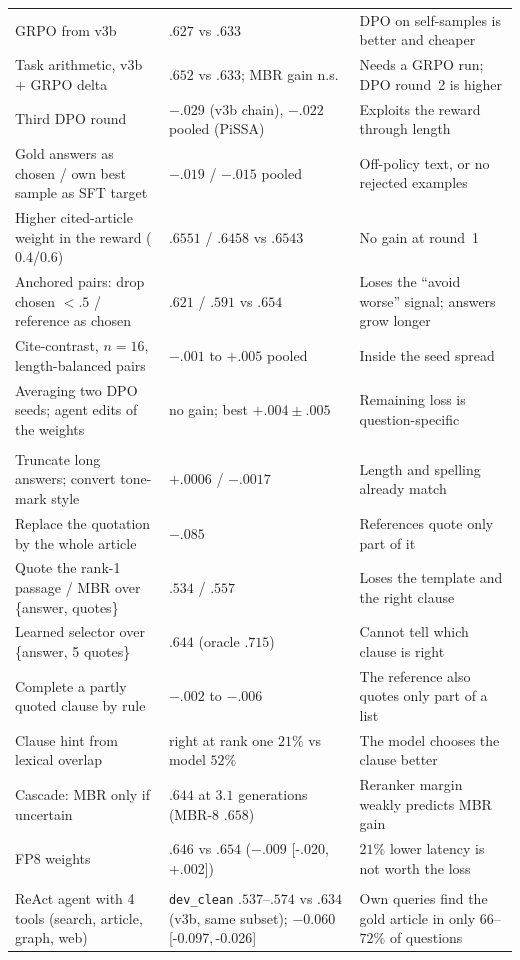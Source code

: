\documentclass[11pt,a4paper]{article}
\newcommand{\ci}[2]{{\scriptsize[#1,\,#2]}}
\begin{document}
\begin{table}[H]
\begin{tabular}{@{}>{\raggedright\arraybackslash}p{5.2cm}>{\raggedright\arraybackslash}p{4.4cm}>{\raggedright\arraybackslash}p{5.6cm}@{}}
GRPO from v3b & $.627$ vs $.633$ & DPO on self-samples is better and cheaper\\
Task arithmetic, v3b + GRPO delta & $.652$ vs $.633$; MBR gain n.s. & Needs a GRPO run; DPO round~2 is higher\\
Third DPO round & $-.029$ (v3b chain), $-.022$ pooled (PiSSA) & Exploits the reward through length\\
Gold answers as chosen / own best sample as SFT target & $-.019$ / $-.015$ pooled & Off-policy text, or no rejected examples\\
Higher cited-article weight in the reward ($0.4$/$0.6$) & $.6551$ / $.6458$ vs $.6543$ & No gain at round~1\\
Anchored pairs: drop chosen $<.5$ / reference as chosen & $.621$ / $.591$ vs $.654$ & Loses the ``avoid worse'' signal; answers grow longer\\
Cite-contrast, $n{=}16$, length-balanced pairs & $-.001$ to $+.005$ pooled & Inside the seed spread\\
Averaging two DPO seeds; agent edits of the weights & no gain; best $+.004\pm.005$ & Remaining loss is question-specific\\
\midrule
\multicolumn{3}{@{}l}{\emph{Decoding and post-processing}}\\
Truncate long answers; convert tone-mark style & $+.0006$ / $-.0017$ & Length and spelling already match\\
Replace the quotation by the whole article & $-.085$ & References quote only part of it\\
Quote the rank-1 passage / MBR over \{answer, quotes\} & $.534$ / $.557$ & Loses the template and the right clause\\
Learned selector over \{answer, 5 quotes\} & $.644$ (oracle $.715$) & Cannot tell which clause is right\\
Complete a partly quoted clause by rule & $-.002$ to $-.006$ & The reference also quotes only part of a list\\
Clause hint from lexical overlap & right at rank one $21\%$ vs model $52\%$ & The model chooses the clause better\\
Cascade: MBR only if uncertain & $.644$ at $3.1$ generations (MBR-8 $.658$) & Reranker margin weakly predicts MBR gain\\
FP8 weights & $.646$ vs $.654$ ($-.009$ \ci{-.020}{+.002}) & $21\%$ lower latency is not worth the loss\\
\midrule
\multicolumn{3}{@{}l}{\emph{Agents}}\\
ReAct agent \cite{react} with 4 tools (search, article, graph, web) & \texttt{dev\_clean} $.537$--$.574$ vs $.634$ (v3b, same subset); $-0.060$ \ci{-0.097}{-0.026} & Own queries find the gold article in only $66$--$72\%$ of questions\\
\bottomrule
\end{tabular}
\end{table}
\end{document}
